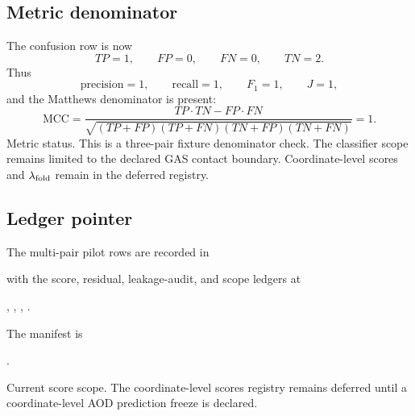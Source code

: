 \subsection{Metric denominator}

The confusion row is now
\[
TP=1,\qquad FP=0,\qquad FN=0,\qquad TN=2.
\]
Thus
\[
\mathrm{precision}=1,\qquad
\mathrm{recall}=1,\qquad
F_1=1,\qquad
J=1,
\]
and the Matthews denominator is present:
\[
\mathrm{MCC}
=
\frac{TP\cdot TN-FP\cdot FN}
{\sqrt{(TP+FP)(TP+FN)(TN+FP)(TN+FN)}}
=
1.
\]
Metric status. This is a three-pair fixture denominator check. The classifier scope remains limited to the declared GAS contact boundary. Coordinate-level scores and $\lambda_{\rm fold}$ remain in the deferred registry.

\subsection{Ledger pointer}

The multi-pair pilot rows are recorded in
\begin{center}
\small
{}
\end{center}
with the score, residual, leakage-audit, and scope ledgers at
\begin{center}
\small
{},\quad
{},\quad
{},\quad
{}.
\end{center}
The manifest is
\begin{center}
\small
{}.
\end{center}

Current score scope. The coordinate-level scores registry remains deferred until a coordinate-level AOD prediction freeze is declared.
